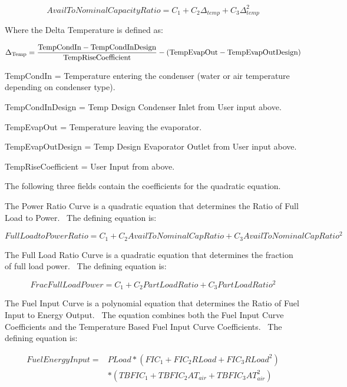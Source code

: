 \begin{equation}
AvailToNominalCapacityRatio = {C_1} + {C_2}{\Delta_{temp}} + {C_3}\Delta_{temp}^2
\end{equation}

Where the Delta Temperature is defined as:

\begin{equation}
{\Delta_{{\rm{Temp}}}} = \frac{{{\rm{TempCondIn  -  TempCondInDesign }}}}{{{\rm{TempRiseCoefficient}}}} - ({\rm{TempEvapOut  -  TempEvapOutDesign)}}
\end{equation}

TempCondIn = Temperature entering the condenser (water or air temperature depending on condenser type).

TempCondInDesign = Temp Design Condenser Inlet from User input above.

TempEvapOut = Temperature leaving the evaporator.

TempEvapOutDesign = Temp Design Evaporator Outlet from User input above.

TempRiseCoefficient = User Input from above.

The following three fields contain the coefficients for the quadratic equation.

The Power Ratio Curve is a quadratic equation that determines the Ratio of Full Load to Power.~ The defining equation is:

\begin{equation}
FullLoadtoPowerRatio = {C_1} + {C_2}AvailToNominalCapRatio + {C_3}AvailToNominalCapRati{o^2}
\end{equation}

The Full Load Ratio Curve is a quadratic equation that determines the fraction of full load power.~ The defining equation is:

\begin{equation}
FracFullLoadPower = {C_1} + {C_2}PartLoadRatio + {C_3}PartLoadRati{o^2}
\end{equation}

The Fuel Input Curve is a polynomial equation that determines the Ratio of Fuel Input to Energy Output.~ The equation combines both the Fuel Input Curve Coefficients and the Temperature Based Fuel Input Curve Coefficients.~ The defining equation is:

\begin{equation}
\begin{split}
FuelEnergyInput =& PLoad * (FI{C_1} + FI{C_2}RLoad + FI{C_3}RLoa{d^2}) \\
&* (TBFI{C_1} + TBFI{C_2}A{T_{air}} + TBFI{C_3}AT_{air}^2)
\end{split}
\end{equation}

